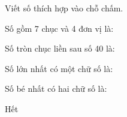 \documentclass[../main.tex]{subfiles}
\begin{document}
\begin{bt}
    Viết số thích hợp vào chỗ chấm.
    \begin{listEX}
        \item Số gồm 7 chục và 4 đơn vị là: \TTcham[2cm]
        \item Số tròn chục liền sau số 40 là: \TTcham[2cm]
        \item Số lớn nhất có một chữ số là: \TTcham[2cm]
        \item Số bé nhất có hai chữ số là: \TTcham[2cm]
    \end{listEX}
\end{bt}
\begin{center}
       \faGg\faGg\quad Hết \quad\faGg\faGg
\end{center}
\end{document}
